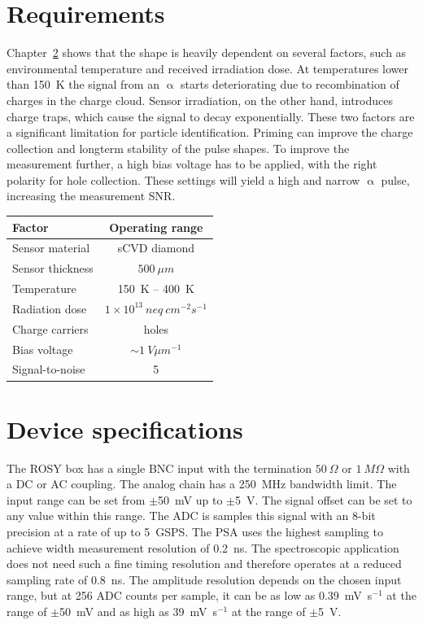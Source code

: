 \documentclass[12pt]{packages/mytustyle}  %
\begin{document}
\section{Requirements}
Chapter~\ref{} shows that the shape is heavily dependent on several factors, such as environmental temperature and received irradiation dose. At temperatures lower than 150~K the signal from an $\upalpha$ starts deteriorating due to recombination of charges in the charge cloud. Sensor irradiation, on the other hand, introduces charge traps, which cause the signal to decay exponentially. These two factors are a significant limitation for particle identification. Priming can improve the charge collection and longterm stability of the pulse shapes. To improve the measurement further, a high bias voltage has to be applied, with the right polarity for hole collection. These settings will yield a high and narrow $\upalpha$ pulse, increasing the measurement SNR. 
\begin{center}
\begin{tabular}{l*{1}{c}}
Factor              & Operating range \\
\hline
Sensor material & sCVD diamond \\
Sensor thickness & $500~\mu m$ \\
Temperature & 150~K -- 400~K \\
Radiation dose & $1\times10^{13}~neq~cm^{-2} s^{-1}$ \\
Charge carriers & holes \\
Bias voltage & $\sim1~V \mu m^{-1}$ \\
Signal-to-noise & 5 \\
\end{tabular}
\label{tab:limits}
\end{center}



\section{Device specifications}
The ROSY box has a single BNC input with the termination $50~\Omega$ or $1~M\Omega$ with a DC or AC coupling. The analog chain has a 250~MHz bandwidth limit. The input range can be set from $\pm$50~mV up to $\pm$5~V. The signal offset can be set to any value within this range. The ADC is samples this signal with an 8-bit precision at a rate of up to 5~GSPS. The PSA uses the highest sampling to achieve width measurement resolution of 0.2~ns. The spectroscopic application does not need such a fine timing resolution and therefore operates at a reduced sampling rate of 0.8~ns. The amplitude resolution depends on the chosen input range, but at 256 ADC counts per sample, it can be as low as 0.39~mV~s$^{-1}$ at the range of $\pm$50~mV and as high as 39~mV~s$^{-1}$ at the range of $\pm$5~V.
\end{document}
